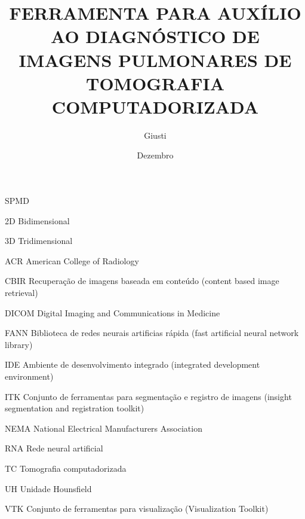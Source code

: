 \documentclass[tc]{texufpel}
\author{Giusti}{Filipe Vernetti}
\title{FERRAMENTA PARA AUXÍLIO AO DIAGNÓSTICO DE IMAGENS PULMONARES DE TOMOGRAFIA COMPUTADORIZADA}
\date{Dezembro}{2008}
\begin{document}
\maketitle

\makeexaminers




\listoffigures
\listoftables

\begin{listofabbrv}{SPMD}
	\item[2D] Bidimensional
	\item[3D] Tridimensional
	\item[ACR] American College of Radiology
	\item[CBIR] Recuperação de imagens baseada em conteúdo (content based image retrieval)
	\item[DICOM] Digital Imaging and Communications in Medicine
	\item[FANN] Biblioteca de redes neurais artificias rápida (fast artificial neural network library)
	\item[IDE] Ambiente de desenvolvimento integrado (integrated development environment)
	\item[ITK] Conjunto de  ferramentas para segmentação e registro de imagens (insight segmentation and registration toolkit)
	\item[NEMA] National Electrical Manufacturers Association
	\item[RNA] Rede neural artificial
	\item[TC] Tomografia computadorizada
	\item[UH] Unidade Hounsfield
	\item[VTK] Conjunto de ferramentas para visualização (Visualization Toolkit)
\end{listofabbrv}

\tableofcontents










\end{document}

